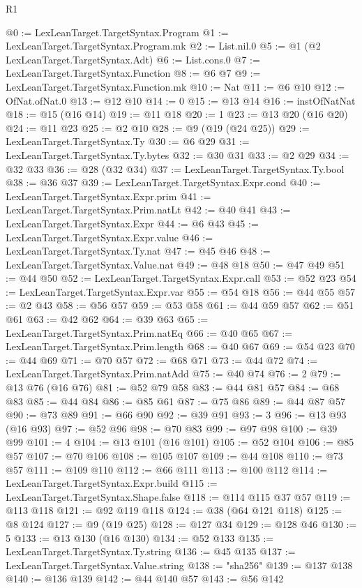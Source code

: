 \begin{lexlean}{R1}
\begin{coremodule}
{{{{{{{{{{{{{{{{{{{{{{{@0 := LexLeanTarget.TargetSyntax.Program
@1 := LexLeanTarget.TargetSyntax.Program.mk
@2 := List.nil.{0}
@5 := @1 (@2 LexLeanTarget.TargetSyntax.Adt)
@6 := List.cons.{0}
@7 := LexLeanTarget.TargetSyntax.Function
@8 := @6 @7
@9 := LexLeanTarget.TargetSyntax.Function.mk
@10 := Nat
@11 := @6 @10
@12 := OfNat.ofNat.{0}
@13 := @12 @10
@14 := 0
@15 := @13 @14
@16 := instOfNatNat
@18 := @15 (@16 @14)
@19 := @11 @18
@20 := 1
@23 := @13 @20 (@16 @20)
@24 := @11 @23
@25 := @2 @10
@28 := @9 (@19 (@24 @25))
@29 := LexLeanTarget.TargetSyntax.Ty
@30 := @6 @29
@31 := LexLeanTarget.TargetSyntax.Ty.bytes
@32 := @30 @31
@33 := @2 @29
@34 := @32 @33
@36 := @28 (@32 @34)
@37 := LexLeanTarget.TargetSyntax.Ty.bool
@38 := @36 @37
@39 := LexLeanTarget.TargetSyntax.Expr.cond
@40 := LexLeanTarget.TargetSyntax.Expr.prim
@41 := LexLeanTarget.TargetSyntax.Prim.natLt
@42 := @40 @41
@43 := LexLeanTarget.TargetSyntax.Expr
@44 := @6 @43
@45 := LexLeanTarget.TargetSyntax.Expr.value
@46 := LexLeanTarget.TargetSyntax.Ty.nat
@47 := @45 @46
@48 := LexLeanTarget.TargetSyntax.Value.nat
@49 := @48 @18
@50 := @47 @49
@51 := @44 @50
@52 := LexLeanTarget.TargetSyntax.Expr.call
@53 := @52 @23
@54 := LexLeanTarget.TargetSyntax.Expr.var
@55 := @54 @18
@56 := @44 @55
@57 := @2 @43
@58 := @56 @57
@59 := @53 @58
@61 := @44 @59 @57
@62 := @51 @61
@63 := @42 @62
@64 := @39 @63
@65 := LexLeanTarget.TargetSyntax.Prim.natEq
@66 := @40 @65
@67 := LexLeanTarget.TargetSyntax.Prim.length
@68 := @40 @67
@69 := @54 @23
@70 := @44 @69
@71 := @70 @57
@72 := @68 @71
@73 := @44 @72
@74 := LexLeanTarget.TargetSyntax.Prim.natAdd
@75 := @40 @74
@76 := 2
@79 := @13 @76 (@16 @76)
@81 := @52 @79 @58
@83 := @44 @81 @57
@84 := @68 @83
@85 := @44 @84
@86 := @85 @61
@87 := @75 @86
@89 := @44 @87 @57
@90 := @73 @89
@91 := @66 @90
@92 := @39 @91
@93 := 3
@96 := @13 @93 (@16 @93)
@97 := @52 @96
@98 := @70 @83
@99 := @97 @98
@100 := @39 @99
@101 := 4
@104 := @13 @101 (@16 @101)
@105 := @52 @104
@106 := @85 @57
@107 := @70 @106
@108 := @105 @107
@109 := @44 @108
@110 := @73 @57
@111 := @109 @110
@112 := @66 @111
@113 := @100 @112
@114 := LexLeanTarget.TargetSyntax.Expr.build
@115 := LexLeanTarget.TargetSyntax.Shape.false
@118 := @114 @115 @37 @57
@119 := @113 @118
@121 := @92 @119 @118
@124 := @38 (@64 @121 @118)
@125 := @8 @124
@127 := @9 (@19 @25)
@128 := @127 @34
@129 := @128 @46
@130 := 5
@133 := @13 @130 (@16 @130)
@134 := @52 @133
@135 := LexLeanTarget.TargetSyntax.Ty.string
@136 := @45 @135
@137 := LexLeanTarget.TargetSyntax.Value.string
@138 := "sha256"
@139 := @137 @138
@140 := @136 @139
@142 := @44 @140 @57
@143 := @56 @142
}}}}}}}}}}}}}}}}}}}}}}}
\end{coremodule}
\end{lexlean}
